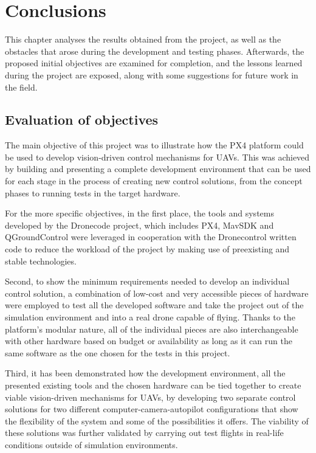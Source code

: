 \chapter{Conclusions}
\label{chap:conclusion}

This chapter analyses the results obtained from the project, as well as the obstacles that arose during the development and testing phases.
Afterwards, the proposed initial objectives are examined for completion, and the lessons learned during the project are exposed, along with some suggestions for future work in the field.

\section{Evaluation of objectives}
\label{sec:consecucion-objetivos}

The main objective of this project was to illustrate how the PX4 platform could be used to develop vision-driven control mechanisms for UAVs.
This was achieved by building and presenting a complete development environment that can be used for each stage in the process of creating new control solutions, from the concept phases to running tests in the target hardware.

For the more specific objectives, in the first place,
the tools and systems developed by the Dronecode project, which includes PX4, MavSDK and QGroundControl were leveraged in cooperation with the Dronecontrol written code to reduce the workload of the project by making use of preexisting and stable technologies.

Second, to show the minimum requirements needed to develop an individual control solution, a combination of low-cost and very accessible pieces of hardware were employed to test all the developed software and take the project out of the simulation environment and into a real drone capable of flying.
Thanks to the platform's modular nature, all of the individual pieces are also interchangeable with other hardware based on budget or availability as long as it can run the same software as the one chosen for the tests in this project.

Third, it has been demonstrated how the development environment, all the presented existing tools and the chosen hardware can be tied together to create viable vision-driven mechanisms for UAVs, 
by developing two separate control solutions for two different computer-camera-autopilot configurations that show the flexibility of the system and some of the possibilities it offers.
The viability of these solutions was further validated by carrying out test flights in real-life conditions outside of simulation environments.

